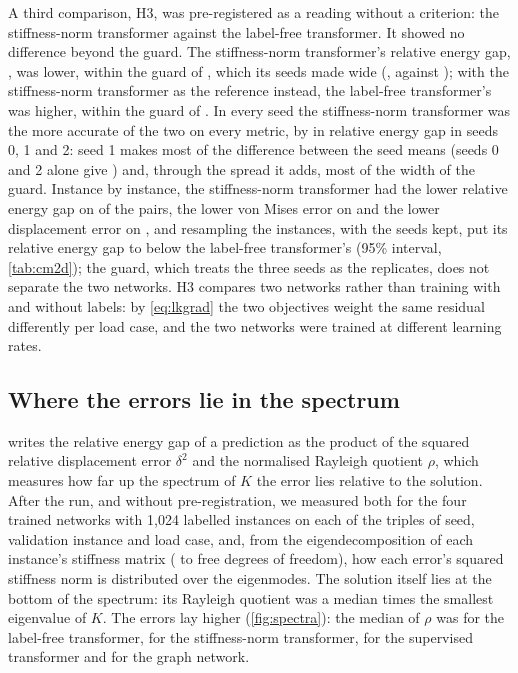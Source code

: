 A third comparison, H3, was pre-registered as a reading without a criterion: the
stiffness-norm transformer against the label-free transformer. It showed no difference
beyond the guard. The stiffness-norm transformer's relative energy gap, \numCmKnormGap{},
was \numHThreeRel{} lower, within the guard of \numHThreeTau{}, which its seeds made wide
(\numCmKnormGapSeeds{}, against \numCmFreeGapSeeds{}); with the stiffness-norm transformer
as the reference instead, the label-free transformer's was \numHThreeExRel{} higher, within
the guard of \numHThreeExTau{}. In every seed the stiffness-norm transformer was the more
accurate of the two on every metric, by \numHThreeSeedRel{} in relative energy gap in seeds
0, 1 and 2: seed 1 makes most of the difference between the seed means (seeds 0 and 2 alone
give \numHThreeSeedsZeroTwo{}) and, through the spread it adds, most of the width of the
guard. Instance by instance, the stiffness-norm transformer had the lower relative energy
gap on \numPairCmKnormFreeGap{} of the pairs, the lower von Mises error on
\numPairCmKnormFreeVm{} and the lower displacement error on \numPairCmKnormFreeDisp{}, and
resampling the instances, with the seeds kept, put its relative energy gap
\numHThreeResLow{} to \numHThreeResHigh{} below the label-free transformer's (95\% interval,
\cref{tab:cm2d}); the guard, which treats the three seeds as the replicates, does not
separate the two networks. H3 compares two networks rather than training with and without
labels: by \eqref{eq:lkgrad} the two objectives weight the same residual differently per
load case, and the two networks were trained at different learning rates.

\subsection{Where the errors lie in the spectrum}\label{sec:results2d:spectrum}

 writes the relative energy gap of a prediction as the product of the
squared relative displacement error $\delta^2$ and the normalised Rayleigh quotient $\rho$,
which measures how far up the spectrum of $K$ the error lies relative to the solution. After
the run, and without pre-registration, we measured both for the four trained networks with
1,024 labelled instances on each of the \numSpecLoads{} triples of seed, validation instance
and load case, and, from the eigendecomposition of each instance's stiffness matrix
(\numSpecFreeMin{} to \numSpecFreeMax{} free degrees of freedom), how each error's squared
stiffness norm is distributed over the eigenmodes. The solution itself lies at the bottom of
the spectrum: its Rayleigh quotient was a median \numSpecRqStarOverMin{} times the smallest
eigenvalue of $K$. The errors lay higher (\cref{fig:spectra}): the median of $\rho$ was
\numSpecRqFree{} for the label-free transformer, \numSpecRqKnorm{} for the stiffness-norm
transformer, \numSpecRqLab{} for the supervised transformer and \numSpecRqMgn{} for the
graph network.

